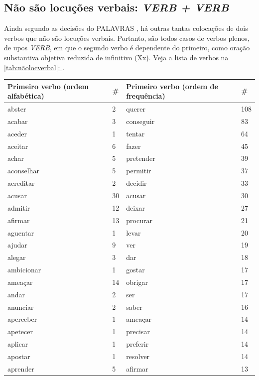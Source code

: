 \documentclass[output=paper,colorlinks,citecolor=brown]{langscibook}
\newcommand*{\fullref}[1]{\hyperref[{#1}]{\autoref*{#1}: \nameref*{#1}}} %
\begin{document}
	\subsection{Não são locuções verbais: \emph{VERB + VERB}}

		Ainda segundo as decisões do PALAVRAS \citep{bick2000parsing}, há outras tantas colocações de dois verbos que não são locuções verbais. Portanto, são todos casos de verbos plenos, de upos \emph{VERB}, em que o segundo verbo é dependente do primeiro, como oração substantiva objetiva reduzida de infinitivo (Xx). Veja a lista de verbos na \fullref{tab:nãolocverbal}.

		\begin{longtable}{ p{3cm} | p{1cm} | p{3cm} | p{1cm} }
			\hline
			\textbf{Primeiro verbo (ordem alfabética)} & \textbf{\#} & \textbf{Primeiro verbo (ordem de frequência)} & \textbf{\#} \\\hline
			abster & 2 & querer & 108\\\hline
			acabar & 3 & conseguir & 83\\\hline
			aceder & 1 & tentar & 64\\\hline
			aceitar & 6 & fazer & 45\\\hline
			achar & 5 & pretender & 39\\\hline
			aconselhar & 5 & permitir & 37\\\hline
			acreditar & 2 & decidir & 33\\\hline
			acusar & 30 & acusar & 30\\\hline
			admitir & 12 & deixar & 27\\\hline
			afirmar & 13 & procurar & 21\\\hline
			aguentar & 1 & levar & 20\\\hline
			ajudar & 9 & ver & 19\\\hline
			alegar & 3 & dar & 18\\\hline
			ambicionar & 1 & gostar & 17\\\hline
			ameaçar & 14 & obrigar & 17\\\hline
			andar & 2 & ser & 17\\\hline
			anunciar & 2 & saber & 16\\\hline
			aperceber & 1 & ameaçar & 14\\\hline
			apetecer & 1 & precisar & 14\\\hline
			aplicar & 1 & preferir & 14\\\hline
			apostar & 1 & resolver & 14\\\hline
			aprender & 5 & afirmar & 13\\\hline

\end{longtable}
\end{document}
